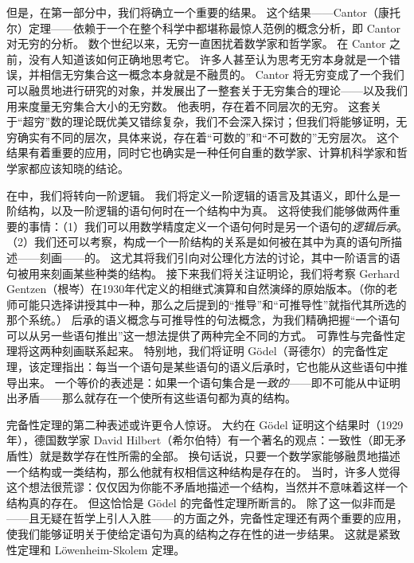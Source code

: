 但是，在第一部分中，我们将确立一个重要的结果。
这个结果——Cantor（康托尔）定理——依赖于一个在整个科学中都堪称最惊人范例的概念分析，即 Cantor 对无穷的分析。
数个世纪以来，无穷一直困扰着数学家和哲学家。
在 Cantor 之前，没有人知道该如何正确地思考它。
许多人甚至认为思考无穷本身就是一个错误，并相信无穷集合这一概念本身就是不融贯的。
Cantor 将无穷变成了一个我们可以融贯地进行研究的对象，并发展出了一整套关于无穷集合的理论——以及我们用来度量无穷集合大小的无穷数。
他表明，存在着不同层次的无穷。
这套关于“超穷”数的理论既优美又错综复杂，我们不会深入探讨；但我们将能够证明，无穷确实有不同的层次，具体来说，存在着“可数的”和“不可数的”无穷层次。
这个结果有着重要的应用，同时它也确实是一种任何自重的数学家、计算机科学家和哲学家都应该知晓的结论。

在中，我们将转向一阶逻辑。
我们将定义一阶逻辑的语言及其语义，即什么是一阶结构，以及一阶逻辑的语句何时在一个结构中为真。
这将使我们能够做两件重要的事情：（1）我们可以用数学精度定义一个语句何时是另一个语句的\emph{逻辑后承}。（2）我们还可以考察，构成一个一阶结构的关系是如何被在其中为真的语句所描述——刻画——的。
这尤其将我们引向对公理化方法的讨论，其中一阶语言的语句被用来刻画某些种类的结构。
接下来我们将关注证明论，我们将考察 Gerhard Gentzen（根岑）在1930年代定义的相继式演算和自然演绎的原始版本。（你的老师可能只选择讲授其中一种，那么之后提到的“推导”和“可推导性”就指代其所选的那个系统。）
后承的语义概念与可推导性的句法概念，为我们精确把握“一个语句可以从另一些语句推出”这一想法提供了两种完全不同的方式。
可靠性与完备性定理将这两种刻画联系起来。
特别地，我们将证明 Gödel（哥德尔）的完备性定理，该定理指出：每当一个语句是某些语句的语义后承时，它也能从这些语句中推导出来。
一个等价的表述是：如果一个语句集合是\emph{一致的}——即不可能从中证明出矛盾——那么就存在一个使所有这些语句都为真的结构。

完备性定理的第二种表述或许更令人惊讶。
大约在 Gödel 证明这个结果时（1929年），德国数学家 David Hilbert（希尔伯特）有一个著名的观点：一致性（即无矛盾性）就是数学存在性所需的全部。
换句话说，只要一个数学家能够融贯地描述一个结构或一类结构，那么他就有权相信这种结构是存在的。
当时，许多人觉得这个想法很荒谬：仅仅因为你能不矛盾地描述一个结构，当然并不意味着这样一个结构真的存在。
但这恰恰是 Gödel 的完备性定理所断言的。
除了这一似非而是——且无疑在哲学上引人入胜——的方面之外，完备性定理还有两个重要的应用，使我们能够证明关于使给定语句为真的结构之存在性的进一步结果。
这就是紧致性定理和 Löwenheim-Skolem 定理。

